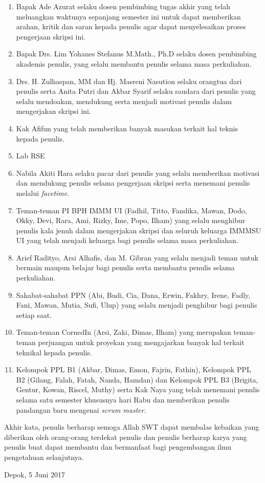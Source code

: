 \begin{enumerate}
\item Bapak Ade Azurat selaku dosen pembimbing tugas akhir yang telah meluangkan waktunya sepanjang semester ini untuk dapat memberikan arahan, kritik dan saran kepada penulis agar dapat menyelesaikan proses pengerjaan skripsi ini.
\item Bapak Drs. Lim Yohanes Stefanus M.Math., Ph.D selaku dosen pembimbing akademis penulis, yang selalu membantu penulis selama masa perkuliahan.
\item Drs. H. Zulhaspan, MM dan Hj. Masreni Nasution selaku orangtua dari penulis serta Anita Putri dan Akbar Syarif selaku saudara dari penulis yang selalu mendoakan, mendukung serta menjadi motivasi penulis dalam mengerjakan skripsi ini.
\item Kak Afifun yang telah memberikan banyak masukan terkait hal teknis kepada penulis.
\item Lab RSE
\item Nabila Akiti Hara selaku pacar dari penulis yang selalu memberikan motivasi dan mendukung penulis selama pengerjaan skripsi serta menemani penulis melalui \textit{facetime}.
\item Teman-teman PI BPH IMMM UI (Fadhil, Titto, Fandika, Mawan, Dodo, Okky, Devi, Rara, Ami, Rizky, Ime, Popo, Ilham) yang selalu menghibur penulis kala jenuh dalam mengerjakan skripsi dan seluruh keluarga IMMMSU UI yang telah menjadi keluarga bagi penulis selama masa perkuliahan.
\item Arief Radityo, Arsi Alhafis, dan M. Gibran yang selalu menjadi teman untuk bermain maupun belajar bagi penulis serta membantu penulis selama perkuliahan.
\item Sahabat-sahabat PPN (Abi, Budi, Cia, Dana, Erwin, Fakhry, Irene, Fadly, Fani, Mawan, Mutia, Sufi, Ulup) yang selalu menjadi penghibur bagi penulis setiap saat.
\item Teman-teman CornedIn (Arsi, Zaki, Dimas, Ilham) yang merupakan teman-teman perjuangan untuk proyekan yang mengajarkan banyak hal terkait teknikal kepada penulis.
\item Kelompok PPL B1 (Akbar, Dimas, Emon, Fajrin, Fathin), Kelompok PPL B2 (Gilang, Falah, Fatah, Nanda, Hamdan) dan Kelompok PPL B3 (Brigita, Gentur, Kowan, Riscel, Muthy) serta Kak Naya yang telah menemani penulis selama satu semester khususnya hari Rabu dan memberikan penulis pandangan baru mengenai \textit{scrum master}.
\end{enumerate}

Akhir kata, penulis berharap semoga Allah SWT dapat membalas kebaikan yang diberikan oleh orang-orang terdekat penulis dan penulis berharap karya yang penulis buat dapat membantu dan bermanfaat bagi pengembangan ilmu pengetahuan selanjutnya.

\vspace*{0.1cm}
\begin{flushright}
Depok, 5 Juni 2017\\[0.1cm]
\vspace*{1cm}
\penulis

\end{flushright}